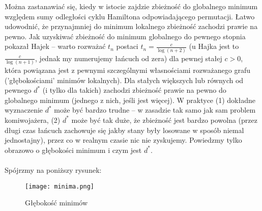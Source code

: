 \documentclass[a4paper]{article}
\theoremstyle{defn}
\theoremstyle{theorem}
\theoremstyle{lemma}
\theoremstyle{cor}
\theoremstyle{fact}
\begin{document}
Można zastanawiać się, kiedy w istocie zajdzie zbieżność do globalnego minimum względem sumy odległości cyklu Hamiltona odpowiadającego permutacji. Łatwo udowodnić, że przynajmniej do minimum lokalnego zbieżność zachodzi prawie na pewno. Jak uzyskiwać zbieżność do minimum globalnego do pewnego stopnia pokazał Hajek \cite{hajek} – warto rozważać $t_n$ postaci $t_n = \frac{c}{\log(n+2)}$ (u Hajka jest to $\frac{c}{\log(n+1)}$, jednak my numerujemy łańcuch od zera) dla pewnej stałej $c>0$, która powiązana jest z pewnymi szczególnymi własnościami rozważanego grafu ('głębokościami' minimów lokalnych). Dla stałych większych lub równych od pewnego $d^*$ (i tylko dla takich) zachodzi zbieżność prawie na pewno do globalnego minimum (jednego z nich, jeśli jest więcej). W praktyce (1) dokładne wyznaczenie $d^*$ może być bardzo trudne – w zasadzie tak samo jak sam problem komiwojażera, (2) $d^*$ może być tak duże, że zbieżność jest bardzo powolna (przez długi czas łańcuch zachowuje się jakby stany były losowane w sposób niemal jednostajny), przez co w realnym czasie nic nie zyskujemy.  Powiedzmy tylko obrazowo o głębokości minimum i czym jest $d^*$. \\\\
Spójrzmy na poniższy rysunek:\\

\begin{center}
\begin{figure}[h]
\texttt{[image: minima.png]}
\caption{Głębokość minimów}
\end{figure}
\end{center}
\end{document}
